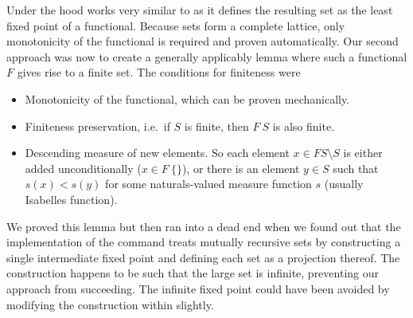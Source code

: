 \documentclass[a4paper,halfparskip,DIV=10,11pt]{scrbook}
\begin{document}
Under the hood  works very similar to  as it defines the resulting set as the least fixed point of a functional. Because sets form a complete lattice, only monotonicity of the functional is required and proven automatically. Our second approach was now to create a generally applicably lemma where such a functional $F$ gives rise to a finite set. The conditions for finiteness were
\begin{itemize}
\item Monotonicity of the functional, which can be proven mechanically.
\item Finiteness preservation, i.e.\ if $S$ is finite, then $F\ S$ is also finite.
\item Descending measure of new elements. So each element $x\in F S \setminus S$ is either added unconditionally ($x\in F\ \{\}$), or there is an element $y \in S$ such that $s(x) < s(y)$ for some naturals-valued measure function $s$ (usually Isabelles  function).
\end{itemize}

We proved this lemma but then ran into a dead end when we found out that the implementation of the  command treats mutually recursive sets by constructing a single intermediate fixed point and defining each set as a projection thereof. The construction happens to be such that the large set is infinite, preventing our approach from succeeding. The infinite fixed point could have been avoided by modifying the construction within  slightly.
\end{document}
